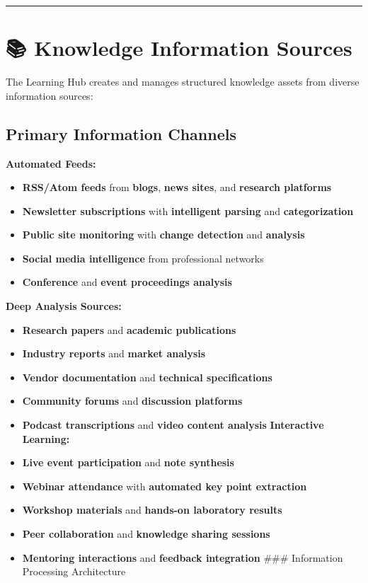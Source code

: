 \documentclass[
  letterpaper,
  DIV=11,
  numbers=noendperiod]{scrartcl}
\providecommand{\tightlist}{%
  \setlength{\itemsep}{0pt}\setlength{\parskip}{0pt}}\usepackage{longtable,booktabs,array}
\begin{document}
\begin{center}\rule{0.5\linewidth}{0.5pt}\end{center}

\section{📚 Knowledge Information
Sources}\label{knowledge-information-sources}

The Learning Hub creates and manages structured knowledge assets from
diverse information sources:

\subsection{Primary Information
Channels}\label{primary-information-channels}

\textbf{Automated Feeds:}

\begin{itemize}
\tightlist
\item
  \textbf{RSS/Atom feeds} from \textbf{blogs}, \textbf{news sites}, and
  \textbf{research platforms}
\item
  \textbf{Newsletter subscriptions} with \textbf{intelligent parsing}
  and \textbf{categorization}
\item
  \textbf{Public site monitoring} with \textbf{change detection} and
  \textbf{analysis}
\item
  \textbf{Social media intelligence} from professional networks
\item
  \textbf{Conference} and \textbf{event proceedings analysis}
\end{itemize}

\textbf{Deep Analysis Sources:}

\begin{itemize}
\item
  \textbf{Research papers} and \textbf{academic publications}
\item
  \textbf{Industry reports} and \textbf{market analysis}
\item
  \textbf{Vendor documentation} and \textbf{technical specifications}
\item
  \textbf{Community forums} and \textbf{discussion platforms}
\item
  \textbf{Podcast transcriptions} and \textbf{video content analysis}
  \textbf{Interactive Learning:}
\item
  \textbf{Live event participation} and \textbf{note synthesis}
\item
  \textbf{Webinar attendance} with \textbf{automated key point
  extraction}
\item
  \textbf{Workshop materials} and \textbf{hands-on laboratory results}
\item
  \textbf{Peer collaboration} and \textbf{knowledge sharing sessions}
\item
  \textbf{Mentoring interactions} and \textbf{feedback integration}
  \#\#\# Information Processing Architecture
\end{itemize}
\end{document}
